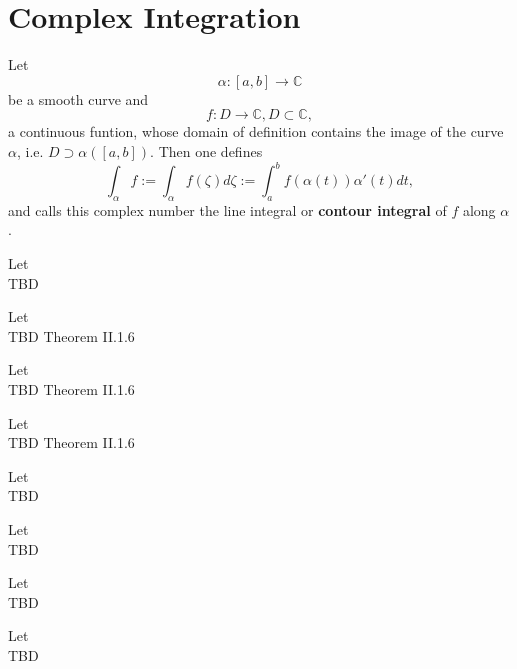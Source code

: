\section{Complex Integration}

\begin{definition}
    \label{sec:ContourIntegral}
    Let
    $$\alpha : [a, b] \rightarrow \mathbb{C}$$
    be a smooth curve and
    $$f: D \rightarrow \mathbb{C}, D \subset \mathbb{C},$$
    a continuous funtion, whose domain of definition contains the image of the curve $\alpha$,
    i.e. $D \supset \alpha([a,b]).$ Then one defines
    $$ \int_\alpha f:= \int_\alpha f(\zeta) d\zeta := \int_a^b f(\alpha(t))\alpha'(t)dt,$$
    and calls this complex number the line integral or \textbf{contour integral} of $f$ along $\alpha$.
\end{definition}

\begin{theorem}
    \label{sec:EstimationT}
    Let \\
    TBD
\end{theorem}


\begin{theorem}
    \label{sec:CauchyITT}
    Let \\
    TBD Theorem II.1.6
\end{theorem}


\begin{theorem}
    \label{sec:CauchyITR}
    Let \\
    TBD Theorem II.1.6
\end{theorem}

\begin{theorem}
    \label{sec:ClosedContourT}
    Let \\
    TBD Theorem II.1.6
\end{theorem}

\begin{theorem}
    \label{sec:CauchyIF}
    Let \\
    TBD
\end{theorem}

\begin{theorem}
    \label{sec:GCauchyIF}
    Let \\
    TBD
\end{theorem}

\begin{theorem}
    \label{sec:MoreraT}
    Let \\
    TBD
\end{theorem}

\begin{theorem}
    \label{sec:LiouvilleT}
    Let \\
    TBD
\end{theorem}